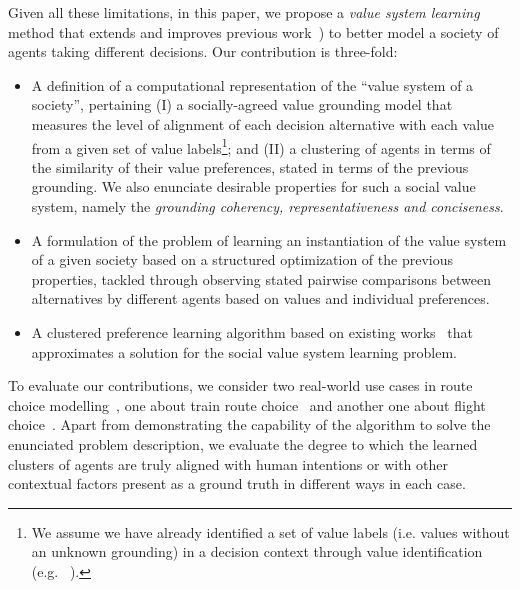 \documentclass{ecai}
\begin{document}
Given all these limitations, in this paper, we propose a \textit{value system learning} method that extends and improves previous work~\cite{andres2024vecompPaper}) to better model a society of agents taking different decisions. Our contribution is three-fold:
\begin{itemize}
    \item A definition of a computational representation of the ``value system of a society'', pertaining (I) a socially-agreed value grounding model that measures the level of alignment of each decision alternative with each value from a given set of value labels\footnote{We assume we have already identified a set of value labels (i.e. values without an unknown grounding) in a decision context through value identification (e.g. ~\cite{Liscio2023axiesContextSpecificValueIdentification}).}; and (II) a clustering of agents in terms of the similarity of their value preferences, stated in terms of the previous grounding. We also enunciate desirable properties for such a social value system, namely the \textit{grounding coherency, representativeness and conciseness}.
    \item A formulation of the problem of learning an instantiation of the value system of a given society based on a structured optimization of the previous properties, tackled through observing stated pairwise comparisons between alternatives by different agents based on values and individual preferences.
    \item A clustered preference learning algorithm based on existing works~\cite{trexpreferences2019,pmlr-v235-chakraborty24b} that approximates a solution for the social value system learning problem.
\end{itemize}
To evaluate our contributions, we consider two real-world use cases in route choice modelling~\cite{routechoicemodelingPRATO2009}, one about train route choice~\cite{apollochoicepublication} and another one about flight choice~\cite{flightChoiceDataset2019}. Apart from demonstrating the capability of the algorithm to solve the enunciated problem description, we evaluate the degree to which the learned clusters of agents are truly aligned with human intentions or with other contextual factors present as a ground truth in different ways in each case.
\end{document}
